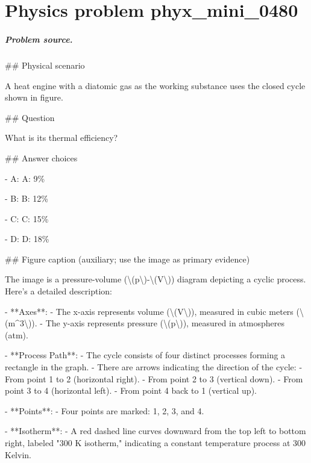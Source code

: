 
\chapter{Physics problem phyx\_mini\_0480}
\label{ch:PhyXMiniProblems_problem_phyx_mini_0480}

\paragraph{Problem source.}
\#\# Physical scenario

A heat engine with a diatomic gas as the working substance uses the closed cycle shown in figure.

\#\# Question

What is its thermal efficiency?

\#\# Answer choices

- A: A: 9\%

- B: B: 12\%

- C: C: 15\%

- D: D: 18\%

\#\# Figure caption (auxiliary; use the image as primary evidence)

The image is a pressure-volume (\textbackslash{}(p\textbackslash{})-\textbackslash{}(V\textbackslash{})) diagram depicting a cyclic process. Here's a detailed description:

- **Axes**: 
  - The x-axis represents volume (\textbackslash{}(V\textbackslash{})), measured in cubic meters (\textbackslash{}(m\textasciicircum{}3\textbackslash{})).
  - The y-axis represents pressure (\textbackslash{}(p\textbackslash{})), measured in atmospheres (atm).

- **Process Path**: 
  - The cycle consists of four distinct processes forming a rectangle in the graph.
  - There are arrows indicating the direction of the cycle:
    - From point 1 to 2 (horizontal right).
    - From point 2 to 3 (vertical down).
    - From point 3 to 4 (horizontal left).
    - From point 4 back to 1 (vertical up).

- **Points**:
  - Four points are marked: 1, 2, 3, and 4.

- **Isotherm**:
  - A red dashed line curves downward from the top left to bottom right, labeled "300 K isotherm," indicating a constant temperature process at 300 Kelvin.

